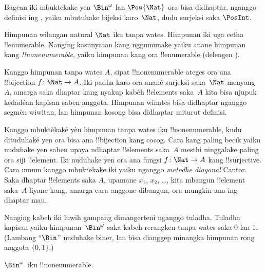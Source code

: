 \documentclass[../../../include/open-logic-section]{subfiles}
\begin{document}


\begin{editorial}
  Bagean iki mbuktekake yen $\Bin^\omega$ lan
  $\Pow{\Nat}$ ora bisa didhaptar, nganggo definisi ing ,
  yaiku mbutuhake bijeksi karo~$\Nat$, dudu surjeksi saka
  $\PosInt$.
\end{editorial}

\begin{explain}
Himpunan wilangan natural $\Nat$ iku tanpa wates.
Himpunan iki uga cetha !!{enumerable}. Nanging kasunyatan kang
nggumunake yaiku anane himpunan kang \emph{!!{nonenumerable}},
yaiku himpunan kang ora !!{enumerable}
(delengen ).

Kanggo himpunan tanpa wates $A$, sipat !!{nonenumerable} ateges ora ana
!!{bijection} $f\colon \Nat \to A$. Iki padha karo ora anané
surjeksi saka~$\Nat$ menyang~$A$, amarga saka dhaptar kang nyakup
kabèh !!{element}s saka~$A$ kita bisa njupuk kedadéan kapisan
saben anggota. Himpunan winates bisa didhaptar nganggo segmèn wiwitan,
lan himpunan kosong bisa didhaptar miturut definisi.

Kanggo mbuktèkaké yèn himpunan tanpa wates iku !!{nonenumerable}, kudu dituduhaké
yen ora bisa ana !!{bijection} kang cocog. Cara kang paling becik
yaiku nuduhake yen saben upaya ndhaptar !!{element}s saka~$A$
mesthi ninggalake paling ora siji !!{element}. Iki nuduhake yen
ora ana fungsi $f\colon \Nat \to A$ kang !!{surjective}.
Cara umum kanggo mbuktekake iki yaiku nganggo \emph{metodhe diagonal} Cantor.
Saka dhaptar !!{element}s saka $A$, upamane $x_1$, $x_2$, \dots,
kita mbangun !!{element} saka~$A$ liyane kang, amarga cara anggone
dibangun, ora mungkin ana ing dhaptar mau.

Nanging kabeh iki luwih gampang dimangerteni nganggo tuladha.
Tuladha kapisan yaiku himpunan~$\Bin^\omega$ saka kabeh rerangken
tanpa wates saka $0$ lan $1$. (Lambang ``$\Bin$'' nuduhake biner,
lan bisa dianggep minangka himpunan rong anggota
$\{0,1\}$.)
\end{explain}

\begin{thm}
$\Bin^\omega$~iku !!{nonenumerable}.
\end{thm}
\end{document}
